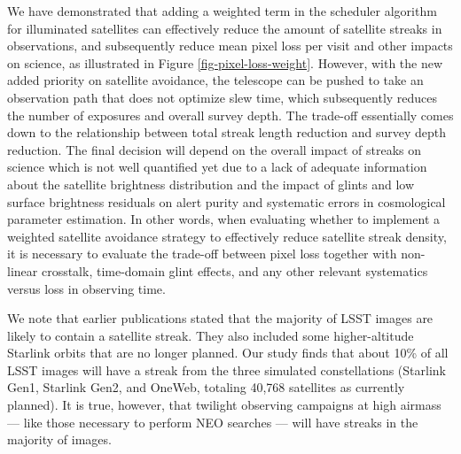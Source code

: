 \documentclass[twocolumn]{aastex631}
\begin{document}
We have demonstrated that adding a weighted term in the scheduler algorithm for illuminated satellites can effectively reduce the amount of satellite streaks in observations, and subsequently reduce mean pixel loss per visit and other impacts on science, as illustrated in Figure \ref{fig-pixel-loss-weight}. 
However, with the new added priority on satellite avoidance, the telescope can be pushed to take an observation path that does not optimize slew time, which subsequently reduces the number of exposures and overall survey depth. The trade-off essentially comes down to the relationship between total streak length reduction and survey depth reduction. The final decision will depend on the overall impact of streaks on science which is not well quantified yet due to a lack of adequate information about the satellite brightness distribution and the impact of glints and low surface brightness residuals on alert purity and systematic errors in cosmological parameter estimation. In other words, 
when evaluating whether to implement a weighted satellite avoidance strategy to effectively reduce satellite streak density, it is necessary to evaluate the trade-off between pixel loss together with non-linear crosstalk, time-domain glint effects, and any other relevant systematics versus loss in observing time. 

We note that earlier publications \citep{lawrence22,tyson20} stated that the majority of LSST images are likely to contain a satellite streak. They also included some higher-altitude Starlink orbits that are no longer planned. Our study finds that about 10\% of all LSST images will have a streak from the three simulated constellations (Starlink Gen1, Starlink Gen2, and OneWeb, totaling 40,768 satellites as currently planned). It is true, however, that twilight observing campaigns at high airmass --- like those necessary to perform NEO searches --- will have streaks in the majority of images.
\end{document}
